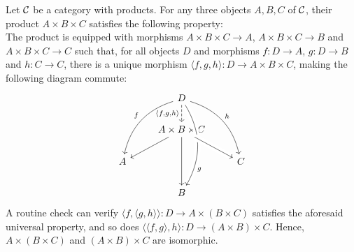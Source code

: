 \begin{xca}
Let $\mathcal{C}$ be a category with products. For any three objects $A, B, C$ of
$\mathcal{C}$, their product $A \times B \times C$ satisfies the following
property:\\
The product is equipped with morphisms $A \times B \times C \to A$, $A \times B
\times C \to B$ and $A \times B \times C \to C$ such that, for all objects $D$
and morphisms $f: D \to A$, $g: D \to B$ and $h: C \to C$, there is a unique
morphism $\langle f, g, h \rangle: D \to A \times B \times C$, making the
following diagram commute:
\[
\begin{tikzcd}
    & D \arrow[ddl, swap, bend right, "f"]
        \arrow[ddd, bend left, crossing over, "g", near end]
        \arrow[ddr, bend left, "h"]
        \arrow[d, swap, dashed, "\langle {f, g, h} \rangle"]
        & \\
    & A \times B \times C \arrow[dl]
                          \arrow[dd]
                          \arrow[dr, crossing over]
                          & \\
    A & & C \\
    & B &
\end{tikzcd}
\]
A routine check can verify $\langle f, \langle g, h \rangle \rangle: D \to
A \times (B \times C)$ satisfies the aforesaid universal property, and so does
$\langle \langle f, g \rangle, h \rangle: D \to (A \times B) \times C$. Hence,
$A \times (B \times C)$ and $(A \times B) \times C$ are isomorphic.
\end{xca}
